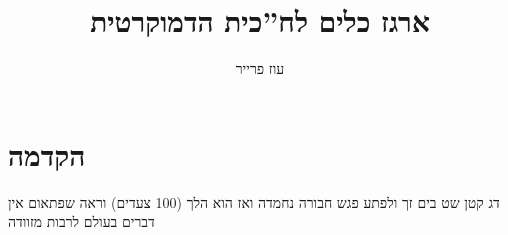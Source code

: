 \documentclass[a4paper,11pt]{article}
\author{עוז פרייר}
\title{ארגז כלים לח''כית הדמוקרטית}
\begin{document}
 
\maketitle
\section {הקדמה}
דג קטן שט בים זך ולפתע פגש חבורה נחמדה ואז הוא הלך (100 צעדים)
וראה שפתאום אין דברים בעולם לרבות מזוודה
\end{document}
